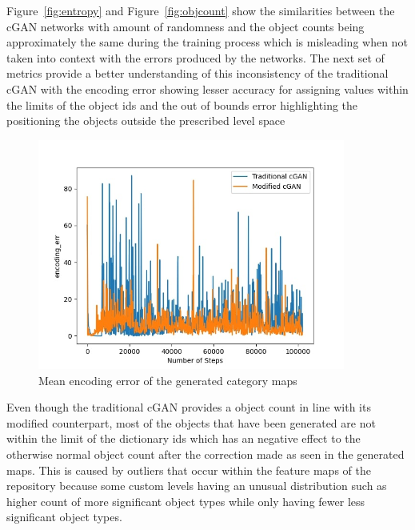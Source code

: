 \documentclass{Configuration_Files/PoliMi3i_thesis}
\begin{document}
Figure~\ref{fig:entropy} and Figure~\ref{fig:objcount} show the similarities between the cGAN networks with amount of 
randomness and the object counts being approximately the same during the training 
process which is misleading when not taken into context with the errors produced by 
the networks. The next set of metrics provide a better understanding of this 
inconsistency of the traditional cGAN with the encoding error showing lesser 
accuracy for assigning values within the limits of the object ids and the out of bounds 
error highlighting the positioning the objects outside the prescribed level space
\begin{figure}[H]
    \centering
    \includegraphics[width=0.9\textwidth]{enc_err.jpg}
    \caption{Mean encoding error of the generated category maps}
    \label{fig:encerror}
\end{figure}
Even though the traditional cGAN provides a object count in line with its modified 
counterpart, most of the objects that have been generated are not within the limit of 
the dictionary ids which has an negative effect to the otherwise normal object count
after the correction made as seen in the generated maps. This is caused by outliers 
that occur within the feature maps of the repository because some custom levels 
having an unusual distribution such as higher count of more significant object types
while only having fewer less significant object types.
\end{document}
